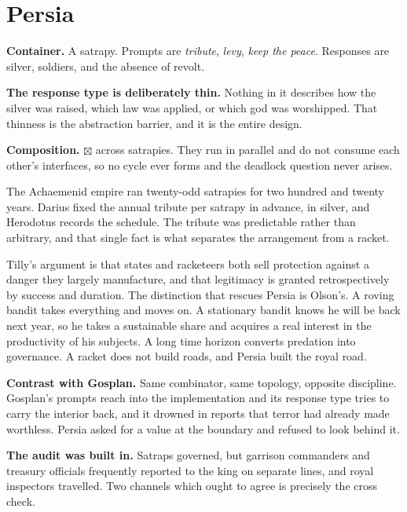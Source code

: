 \documentclass[11pt,a4paper]{article}
\begin{document}
\section{Persia}

\begin{sectionbox}
\textbf{Container.} A satrapy. Prompts are \emph{tribute}, \emph{levy}, \emph{keep
the peace}. Responses are silver, soldiers, and the absence of revolt.

\textbf{The response type is deliberately thin.} Nothing in it describes how the
silver was raised, which law was applied, or which god was worshipped. That
thinness is the abstraction barrier, and it is the entire design.

\textbf{Composition.} $\boxtimes$ across satrapies. They run in parallel and do not
consume each other's interfaces, so no cycle ever forms and the deadlock question
never arises.
\end{sectionbox}

The Achaemenid empire ran twenty-odd satrapies for two hundred and twenty years.
Darius fixed the annual tribute per satrapy in advance, in silver, and Herodotus
records the schedule. The tribute was predictable rather than arbitrary, and that
single fact is what separates the arrangement from a racket.

Tilly's argument is that states and racketeers both sell protection against a
danger they largely manufacture, and that legitimacy is granted retrospectively by
success and duration. The distinction that rescues Persia is Olson's. A roving
bandit takes everything and moves on. A stationary bandit knows he will be back
next year, so he takes a sustainable share and acquires a real interest in the
productivity of his subjects. A long time horizon converts predation into
governance. A racket does not build roads, and Persia built the royal road.

\textbf{Contrast with Gosplan.} Same combinator, same topology, opposite
discipline. Gosplan's prompts reach into the implementation and its response type
tries to carry the interior back, and it drowned in reports that terror had already
made worthless. Persia asked for a value at the boundary and refused to look behind
it.

\textbf{The audit was built in.} Satraps governed, but garrison commanders and
treasury officials frequently reported to the king on separate lines, and royal
inspectors travelled. Two channels which ought to agree is precisely the cross
check.
\end{document}
